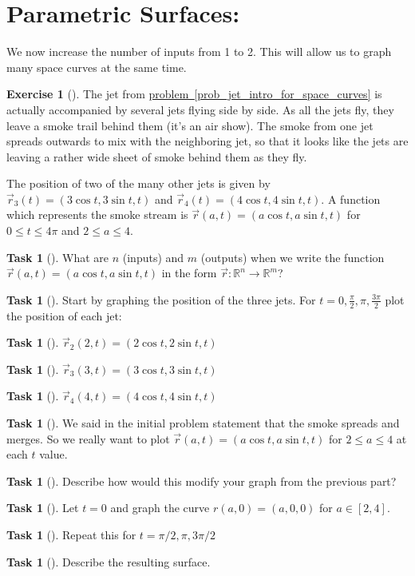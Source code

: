 \documentclass[10pt,]{book}
\theoremstyle{plain}
\theoremstyle{definition}
\theoremstyle{definition}
\theoremstyle{definition}
\theoremstyle{definition}
\newtheorem{exploration}[project]{Exercise}
\newtheorem{task}[project]{Task}
\theoremstyle{definition}
\numberwithin{equation}{section}
\begin{document}
\section[{Parametric Surfaces:}]{Parametric Surfaces:}\label{section-17}
We now increase the number of inputs from 1 to 2. This will allow us to graph many space curves at the same time.%
\begin{exploration}[]\label{prob_parametric_surface_example}
The jet from \hyperref[prob_jet_intro_for_space_curves]{problem~\ref{prob_jet_intro_for_space_curves}} is actually accompanied by several jets flying side by side. As all the jets fly, they leave a smoke trail behind them (it's an air show). The smoke from one jet spreads outwards to mix with the neighboring jet, so that it looks like the jets are leaving a rather wide sheet of smoke behind them as they fly.%
\par
The position of two of the many other jets is given by \(\vec r_3(t)=(3\cos t, 3\sin t, t)\) and \(\vec r_4(t)=(4\cos t,4\sin t,t)\). A function which represents the smoke stream is \(\vec r(a,t)=(a\cos t, a\sin t, t)\) for \(0\leq t\leq 4\pi\) and \(2\leq a\leq 4\).%
\begin{task}[]\label{task-183}
What are \(n\) (inputs) and \(m\) (outputs) when we write the function \(\vec r(a,t)=(a\cos t, a\sin t, t)\) in the form  \(\vec r\colon {\mathbb{R}}^n\to {\mathbb{R}}^m\)?%
\end{task}
\begin{task}[]\label{task-184}
Start by graphing the position of the three jets. For \(t=0, \frac{\pi}{2}, \pi, \frac{3\pi}{2}\) plot the position of each jet:%
\begin{task}[]\label{task-185}
\(\vec r_2(2,t)=(2\cos t, 2\sin t, t)\)%
\end{task}
\begin{task}[]\label{task-186}
\(\vec r_3(3,t)=(3\cos t, 3\sin t, t)\)%
\end{task}
\begin{task}[]\label{task-187}
\(\vec r_4(4,t)=(4\cos t, 4\sin t, t)\)%
\end{task}
\end{task}
\begin{task}[]\label{task-188}
We said in the initial problem statement that the smoke spreads and merges. So we really want to plot \(\vec{r}(a,t)=(a\cos t, a\sin t, t)\) for \(2\leq a \leq 4\) at each \(t\) value.%
\begin{task}[]\label{task-189}
Describe how would this modify your graph from the previous part?%
\end{task}
\begin{task}[]\label{task-190}
Let \(t=0\) and graph the curve \(r(a,0)=(a,0,0)\) for \(a\in[2,4]\).%
\end{task}
\begin{task}[]\label{task-191}
Repeat this for \(t=\pi/2,\pi,3\pi/2\)%
\end{task}
\end{task}
\begin{task}[]\label{task-192}
Describe the resulting surface.%
\end{task}
\end{exploration}
\end{document}
